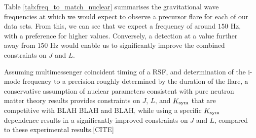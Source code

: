\documentclass[fleqn,usenatbib]{mnras}
\begin{document}
\hspace{\parindent}Table \ref{tab:freq_to_match_nuclear} summarises the gravitational wave frequencies at which we would expect to observe a precursor flare for each of our data sets. From this, we can see that we expect a frequency of around $150$ Hz, with a preference for higher values. Conversely, a detection at a value further away from $150$ Hz would enable us to significantly improve the combined constraints on $J$ and $L$.

Assuming multimessenger coincident timing of a RSF, and determination of the i-mode frequency to a precision roughly determined by the duration of the flare, a conservative assumption of nuclear parameters consistent with pure neutron matter theory results provides constraints on $J$, $L$, and $K_{\rm sym}$ that are competitive with BLAH BLAH and BLAH, while using a specific $K_{\rm sym}$ dependence results in a significantly improved constraints on $J$ and $L$, compared to these experimental results.[CITE]






\end{document}

